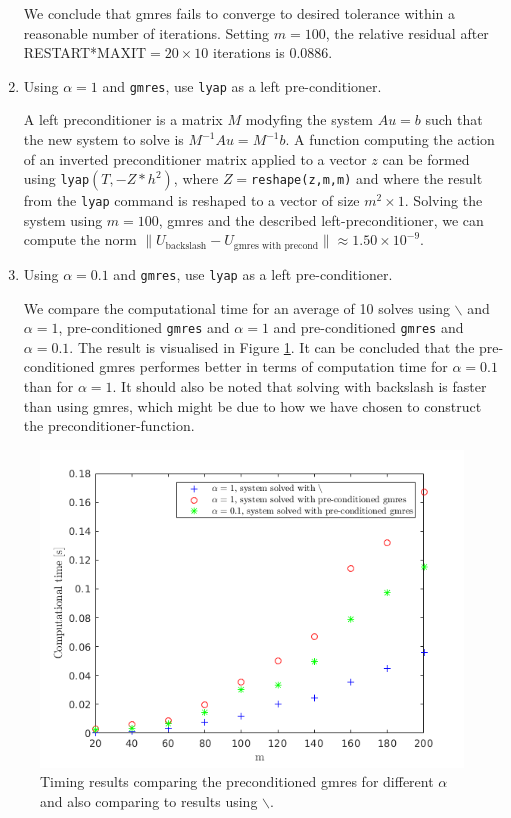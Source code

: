 \begin{enumerate}
We conclude that gmres fails to converge to desired tolerance within a reasonable number of iterations. Setting $m=100$, the relative residual after RESTART*MAXIT$=20\times 10$ iterations is 0.0886.
\item Using $\alpha = 1$ and \texttt{gmres}, use \texttt{lyap} as a left pre-conditioner.

A left preconditioner is a matrix $M$ modyfing  the system $Au = b$ such that the new system to solve is $M^{-1}Au = M^{-1}b$. A function computing the action of an inverted preconditioner matrix applied to a vector $z$ can be formed using \texttt{lyap}$(T,-Z*h^2)$, where $Z=$\texttt{reshape(z,m,m)} and where the result from the \texttt{lyap} command is reshaped to a vector of size $m^2\times 1$. Solving the system using $m=100$, gmres and the described left-preconditioner, we can compute the norm $\|U_{\text{backslash}}-U_{\text{gmres with precond}}\| \approx 1.50\times 10^{-9}$.

\item Using $\alpha = 0.1$ and \texttt{gmres}, use \texttt{lyap} as a left pre-conditioner.

We compare the computational time for an average of 10 solves using $\backslash$ and $\alpha = 1$, pre-conditioned \texttt{gmres} and $\alpha=1$ and pre-conditioned \texttt{gmres} and $\alpha = 0.1$. The result is visualised in Figure \ref{time12_2}. It can be concluded that the pre-conditioned gmres performes better in terms of computation time for $\alpha = 0.1$ than for $\alpha = 1$. It should also be noted that solving with backslash is faster than using gmres, which might be due to how we have chosen to construct the preconditioner-function.
\end{enumerate}
\begin{figure}[h!]
\centering
\includegraphics[scale=0.6]{time_gmres.png}
\caption{Timing results comparing the preconditioned gmres for different $\alpha$ and also comparing to results using $\backslash$.}
\label{time12_2}
\end{figure}

